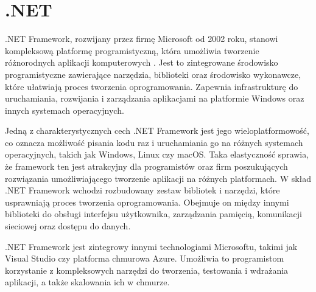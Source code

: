 \section{.NET}

.NET Framework, rozwijany przez firmę Microsoft od 2002 roku, stanowi kompleksową platformę programistyczną, która umożliwia tworzenie różnorodnych aplikacji komputerowych \cite{microsoftNETBuild}.
Jest to zintegrowane środowisko programistyczne zawierające narzędzia, biblioteki oraz środowisko wykonawcze, które ułatwiają proces tworzenia oprogramowania.
Zapewnia infrastrukturę do uruchamiania, rozwijania i zarządzania aplikacjami na platformie Windows oraz innych systemach operacyjnych.

Jedną z charakterystycznych cech .NET Framework jest jego wieloplatformowość, co oznacza możliwość pisania kodu raz i uruchamiania go na różnych systemach operacyjnych, takich jak Windows, Linux czy macOS.
Taka elastyczność sprawia, że framework ten jest atrakcyjny dla programistów oraz firm poszukujących rozwiązania umożliwiającego tworzenie aplikacji na różnych platformach.
W skład .NET Framework wchodzi rozbudowany zestaw bibliotek i narzędzi, które usprawniają proces tworzenia oprogramowania.
Obejmuje on między innymi biblioteki do obsługi interfejsu użytkownika, zarządzania pamięcią, komunikacji sieciowej oraz dostępu do danych.

.NET Framework jest zintegrowy innymi technologiami Microsoftu, takimi jak Visual Studio czy platforma chmurowa Azure.
Umożliwia to programistom korzystanie z kompleksowych narzędzi do tworzenia, testowania i wdrażania aplikacji, a także skalowania ich w chmurze.